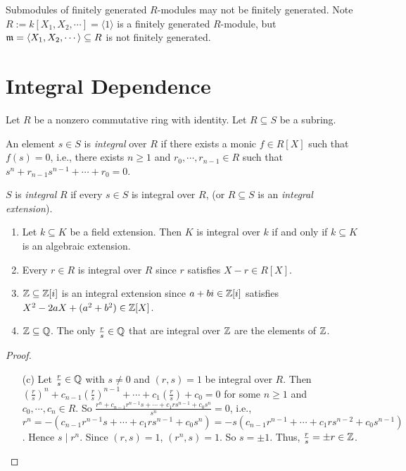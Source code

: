 \begin{example}
    Submodules of finitely generated $R$-modules may not be finitely generated. Note $R := k[X_1,X_2,\cdots] = \langle 1 \rangle$ is a finitely generated $R$-module, but $\mathfrak{m} = \langle X_1,X_2,\cdots \rangle \subseteq R$ is not finitely generated.
\end{example}

\section*{Integral Dependence}

Let $R$ be a nonzero commutative ring with identity. Let $R \subseteq S$ be a subring.

\begin{definition}
    An element $s \in S$ is \emph{integral} over $R$ if there exists a monic $f \in R[X]$ such that $f(s) = 0$, i.e., there exists $n \geq 1$ and $r_0,\cdots,r_{n-1} \in R$ such that $s^{n} + r_{n-1}s^{n-1} + \cdots + r_0 = 0$. \par 
    $S$ is \emph{integral} $R$ if every $s \in S$ is integral over $R$, (or $R \subseteq S$ is an \emph{integral extension}).
\end{definition}

\begin{example}
    \begin{enumerate}
        \item Let $k \subseteq K$ be a field extension. Then $K$ is integral over $k$ if and only if $k \subseteq K$ is an algebraic extension. 
        \item Every $r \in R$ is integral over $R$ since $r$ satisfies $X-r \in R[X]$. 
        \item $\mathbb{Z} \subseteq \mathbb{Z}[i]$ is an integral extension since $a+bi \in \mathbb{Z}[i]$ satisfies $X^{2}-2aX+(a^{2}+b^{2}) \in \mathbb{Z}[X]$.
        \item $\mathbb{Z} \subseteq \mathbb{Q}$. The only $\frac{r}{s} \in \mathbb{Q}$ that are integral over $\mathbb{Z}$ are the elements of $\mathbb{Z}$.
    \end{enumerate}
\end{example}

\begin{proof}
    \begin{enumerate}
        \item[(c)] Let $\frac{r}{s} \in \mathbb{Q}$ with $s \neq 0$ and $(r,s) = 1$ be integral over $R$. Then $(\frac{r}{s})^{n} + c_{n-1} (\frac{r}{s})^{n-1} + \cdots + c_1(\frac{r}{s}) + c_0 = 0$ for some $n \geq 1$ and $c_0,\cdots,c_n \in R$. So $\frac{r^{n} + c_{n-1}r^{n-1}s + \cdots + c_1rs^{n-1} + c_0s^{n}}{s^{n}} = 0$, i.e., $r^{n} = -(c_{n-1}r^{n-1}s + \cdots + c_1r s^{n-1} + c_0s^{n}) = -s(c_{n-1}r^{n-1} + \cdots + c_1rs^{n-2} + c_0s^{n-1})$. Hence $s \mid r^{n}$. Since $(r,s) = 1$, $(r^{n},s) = 1$. So $s = \pm 1$. Thus, $\frac{r}{s} = \pm r \in \mathbb{Z}$. \qedhere
    \end{enumerate}
\end{proof}

